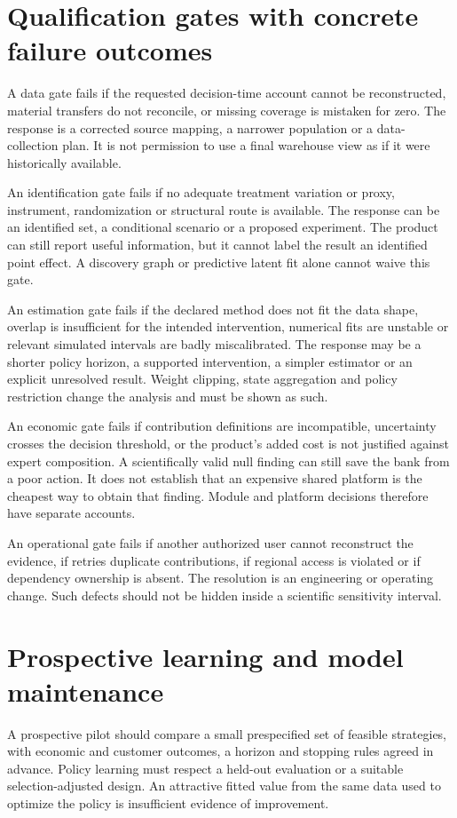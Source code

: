 \section{Qualification gates with concrete failure outcomes}
A data gate fails if the requested decision-time account cannot be
reconstructed, material transfers do not reconcile, or missing coverage is
mistaken for zero. The response is a corrected source mapping, a narrower
population or a data-collection plan. It is not permission to use a final
warehouse view as if it were historically available.

An identification gate fails if no adequate treatment variation or proxy,
instrument, randomization or structural route is available. The response
can be an identified set, a conditional scenario or a proposed experiment.
The product can still report useful information, but it cannot label the
result an identified point effect. A discovery graph or predictive latent
fit alone cannot waive this gate.

An estimation gate fails if the declared method does not fit the data
shape, overlap is insufficient for the intended intervention, numerical
fits are unstable or relevant simulated intervals are badly miscalibrated.
The response may be a shorter policy horizon, a supported intervention,
a simpler estimator or an explicit unresolved result. Weight clipping,
state aggregation and policy restriction change the analysis and must be
shown as such.

An economic gate fails if contribution definitions are incompatible,
uncertainty crosses the decision threshold, or the product's added cost is
not justified against expert composition. A scientifically valid null
finding can still save the bank from a poor action. It does not establish
that an expensive shared platform is the cheapest way to obtain that
finding. Module and platform decisions therefore have separate accounts.

An operational gate fails if another authorized user cannot reconstruct
the evidence, if retries duplicate contributions, if regional access is
violated or if dependency ownership is absent. The resolution is an
engineering or operating change. Such defects should not be hidden inside
a scientific sensitivity interval.

\section{Prospective learning and model maintenance}
A prospective pilot should compare a small prespecified set of feasible
strategies, with economic and customer outcomes, a horizon and stopping
rules agreed in advance. Policy learning must respect a held-out evaluation
or a suitable selection-adjusted design. An attractive fitted value from
the same data used to optimize the policy is insufficient evidence of
improvement.

